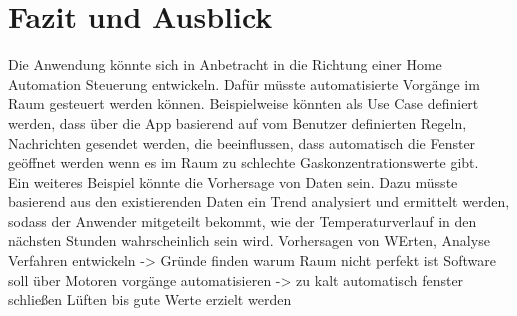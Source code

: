 \chapter{Fazit und Ausblick}
Die Anwendung könnte sich in Anbetracht in die Richtung einer Home Automation Steuerung entwickeln. Dafür müsste automatisierte Vorgänge im Raum gesteuert werden können. Beispielweise könnten als Use Case definiert werden, dass über die App basierend auf vom Benutzer definierten Regeln, Nachrichten gesendet werden, die beeinflussen, dass automatisch die Fenster geöffnet werden wenn es im Raum zu schlechte Gaskonzentrationswerte gibt.  
\\Ein weiteres Beispiel könnte die Vorhersage von Daten sein. Dazu müsste basierend aus den existierenden Daten ein Trend analysiert und ermittelt werden, sodass der Anwender mitgeteilt bekommt, wie der Temperaturverlauf in den nächsten Stunden wahrscheinlich sein wird. 
Vorhersagen von WErten,
Analyse Verfahren entwickeln -> Gründe finden warum Raum nicht perfekt ist
Software soll über Motoren vorgänge automatisieren -> zu kalt automatisch fenster schließen
Lüften bis gute Werte erzielt werden
